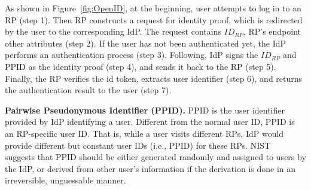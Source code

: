As shown in Figure~\ref{fig:OpenID},
at the beginning, user attempts to log in to an RP (step 1). Then RP constructs a request for identity proof, which is redirected by the user to the corresponding IdP. The request contains $ID_{RP}$, RP's endpoint other attributes (step 2). If the user has not been authenticated yet, the IdP performs an authentication process (step 3). Following, IdP signs the $ID_{RP}$ and PPID as the identity proof (step 4), and sends it back to the RP (step 5). Finally, the RP verifies the id token, extracts user identifier (step 6), and returns the authentication result to the user (step 7).

\vspace{1mm}\noindent\textbf{Pairwise Pseudonymous Identifier (PPID).}
PPID is the user identifier provided by IdP identifying a user. Different from the normal user ID, PPID is an RP-specific user ID. That is, while a user visits different RPs, IdP would provide different but constant user IDs (i.e., PPID) for these RPs.
NIST~\cite{NIST2017draft} suggests that PPID should be either generated randomly and assigned to users by the IdP, or derived from other user's information if the derivation is done in an irreversible, unguessable manner.


